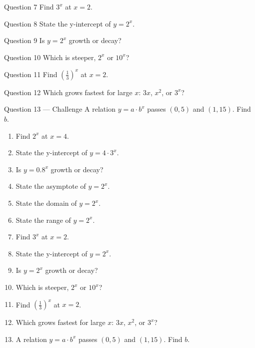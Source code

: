 \documentclass[11pt]{article}
\begin{document}
\begin{qbox}{Question 7}
Find $3^x$ at $x=2$.\workspace{2.4cm}
\end{qbox}

\begin{qbox}{Question 8}
State the y-intercept of $y=2^x$.\workspace{2.4cm}
\end{qbox}

\begin{qbox}{Question 9}
Is $y=2^x$ growth or decay?\workspace{2.4cm}
\end{qbox}

\begin{qbox}{Question 10}
Which is steeper, $2^x$ or $10^x$?\workspace{2.4cm}
\end{qbox}

\begin{qbox}{Question 11}
Find $\left(\tfrac13\right)^x$ at $x=2$.\workspace{2.4cm}
\end{qbox}

\begin{qbox}{Question 12}
Which grows fastest for large $x$: $3x$, $x^2$, or $3^x$?\workspace{2.4cm}
\end{qbox}

\begin{qbox}{Question 13 --- Challenge}
A relation $y=a\cdot b^x$ passes $(0,5)$ and $(1,15)$. Find $b$.\workspace{2.6cm}
\end{qbox}

\clearpage
{}

\begin{recapbox}
\begin{multicols}{2}
\small
\begin{enumerate}[leftmargin=*,itemsep=3pt]
  \item Find $2^x$ at $x=4$.
  \item State the y-intercept of $y=4\cdot3^x$.
  \item Is $y=0.8^x$ growth or decay?
  \item State the asymptote of $y=2^x$.
  \item State the domain of $y=2^x$.
  \item State the range of $y=2^x$.
  \item Find $3^x$ at $x=2$.
  \item State the y-intercept of $y=2^x$.
  \item Is $y=2^x$ growth or decay?
  \item Which is steeper, $2^x$ or $10^x$?
  \item Find $\left(\tfrac13\right)^x$ at $x=2$.
  \item Which grows fastest for large $x$: $3x$, $x^2$, or $3^x$?
  \item A relation $y=a\cdot b^x$ passes $(0,5)$ and $(1,15)$. Find $b$.
\end{enumerate}
\end{multicols}
\end{recapbox}
\end{document}
